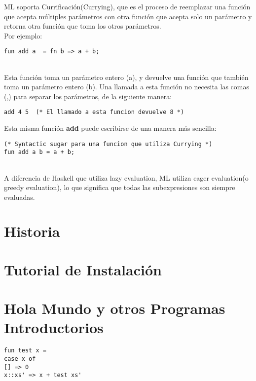 \documentclass[11pt]{article} %
\begin{document}
ML soporta Currificación(Currying), que es el proceso de reemplazar una función que acepta múltiples parámetros con otra función que acepta solo un parámetro y retorna otra función que toma los otros parámetros.\\
Por ejemplo:\\
\begin{lstlisting}[frame=single]
fun add a  = fn b => a + b;
\end{lstlisting}\\

Esta función toma un parámetro entero (a), y devuelve una función que también toma un parámetro entero (b). Una llamada a esta función no necesita las comas (,) para separar los parámetros, de la siguiente manera:\\

\begin{lstlisting}[frame=single]
add 4 5  (* El llamado a esta funcion devuelve 8 *) 
\end{lstlisting}

Esta misma función {\bf add} puede escribirse de una manera más sencilla:\\

\begin{lstlisting}[frame=single]
(* Syntactic sugar para una funcion que utiliza Currying *)
fun add a b = a + b;
\end{lstlisting}\\

A diferencia de Haskell que utiliza lazy evaluation, ML utiliza eager evaluation(o greedy evaluation), lo que significa que todas las subexpresiones son siempre evaluadas.

\section{\color{red}Historia}
\section{\color{red}Tutorial de Instalación}
\section{\color{red}Hola Mundo y otros Programas Introductorios}

\lstset{language=ML}          %

\begin{lstlisting}[frame=single]  % Start your code-block
fun test x =
case x of
[] => 0
x::xs' => x + test xs'
\end{lstlisting}
\end{document}
